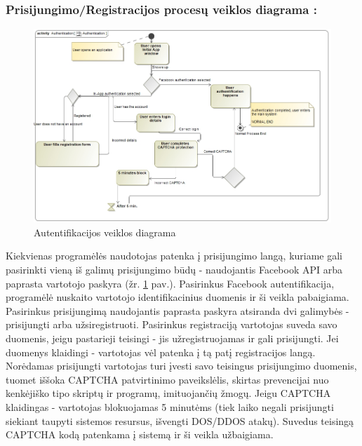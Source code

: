 \documentclass{VUMIFPSkursinis}
\begin{document}
		\subsubsection*{Prisijungimo/Registracijos procesų veiklos diagrama :}
		\begin{figure}[H]
			\centering
			\includegraphics[scale=0.5]{img/Authentication}
			\caption{Autentifikacijos veiklos diagrama}
			\label{img:Authentication}
		\end{figure}
		Kiekvienas programėlės naudotojas patenka į prisijungimo langą, kuriame gali 			pasirinkti vieną iš galimų prisijungimo būdų - naudojantis Facebook API arba 			paprasta vartotojo paskyra (žr. \ref{img:Authentication} pav.). Pasirinkus Facebook autentifikacija, programėlė 			nuskaito vartotojo identifikacinius duomenis ir ši veikla pabaigiama. Pasirinkus 			prisijungimą naudojantis paprasta paskyra atsiranda dvi galimybės - prisijungti 		arba užsiregistruoti. Pasirinkus registraciją vartotojas suveda savo duomenis, 			jeigu pastarieji teisingi - jis užregistruojamas ir gali prisijungti. Jei duomenys 			klaidingi - vartotojas vėl patenka į tą patį registracijos langą. Norėdamas 			prisijungti vartotojas turi įvesti savo teisingus prisijungimo duomenis, tuomet 		iššoka CAPTCHA patvirtinimo paveikslėlis, skirtas prevencijai nuo kenkėjiško tipo 			skriptų ir programų, imituojančių žmogų. Jeigu CAPTCHA klaidingas - vartotojas 			blokuojamas 5 minutėms (tiek laiko negali prisijungti siekiant taupyti sistemos 		resursus, išvengti DOS/DDOS atakų). Suvedus teisingą CAPTCHA kodą patenkama į 			sistemą ir ši veikla užbaigiama.
\end{document}
